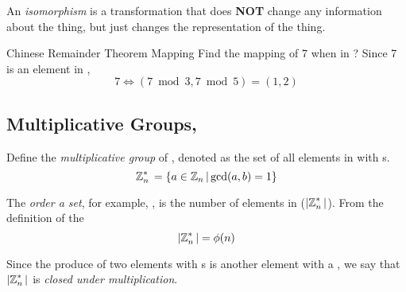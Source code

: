 \begin{definition}[Isomorphism]\label{def:Isomorphism}
  An \emph{isomorphism} is a transformation that does \textbf{NOT} change any information about the thing, but just changes the representation of the thing.
\end{definition}

\begin{example}[]{Chinese Remainder Theorem Mapping}
  Find the mapping of $7$ when in ?
  \tcblower{}
  Since 7 is an element in ,
  \begin{equation*}
    7 \Leftrightarrow (7 \bmod 3, 7 \bmod 5) = (1, 2)
  \end{equation*}
\end{example}

\subsection{\texorpdfstring{Multiplicative Groups, \TextMultiplicativeGroupN{}}{Multiplicative Groups}}\label{Multiplicative_Groups}
\begin{definition}\label{def:Multiplicative_Group}
  Define the \emph{multiplicative group} of \TextIntsModN{}, denoted \TextMultiplicativeGroupN{} as the set of all elements in \TextIntsModN{} with s.
  \begin{equation}\label{eq:Multiplicative_Group}
    \operatorname{\mathbb{Z}}_{n}^{*}{} = \lbrace a \in \operatorname{\mathbb{Z}}_{n}{} \vert \gcd(a, b) = 1 \rbrace
  \end{equation}
\end{definition}

\begin{definition}\label{def:Set_Order}
  The \emph{order a set}, for example, \TextMultiplicativeGroupN{}, is the number of elements in \TextMultiplicativeGroupN{} ($\lvert \operatorname{\mathbb{Z}}_{n}^{*}{} \rvert$).
  From the definition of the 
  \begin{equation}\label{eq:Set_Order_Euler_Phi_Function}
    \lvert \operatorname{\mathbb{Z}}_{n}^{*}{} \rvert = \phi(n)
  \end{equation}

  \begin{remark}\label{rmk:Set_Order_Closed_Multiplication}
    Since the produce of two elements with s is another element with a , we say that $\lvert \operatorname{\mathbb{Z}}_{n}^{*}{} \rvert$ is \emph{closed under multiplication}.
  \end{remark}
\end{definition}

